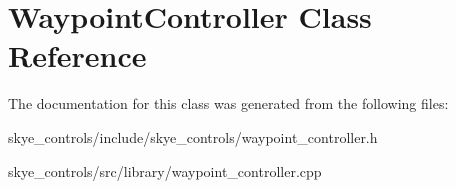 \hypertarget{class_waypoint_controller}{\section{Waypoint\-Controller Class Reference}
\label{class_waypoint_controller}
}


The documentation for this class was generated from the following files\-:\begin{DoxyCompactItemize}
\item 
skye\-\_\-controls/include/skye\-\_\-controls/waypoint\-\_\-controller.\-h\item 
skye\-\_\-controls/src/library/waypoint\-\_\-controller.\-cpp\end{DoxyCompactItemize}
